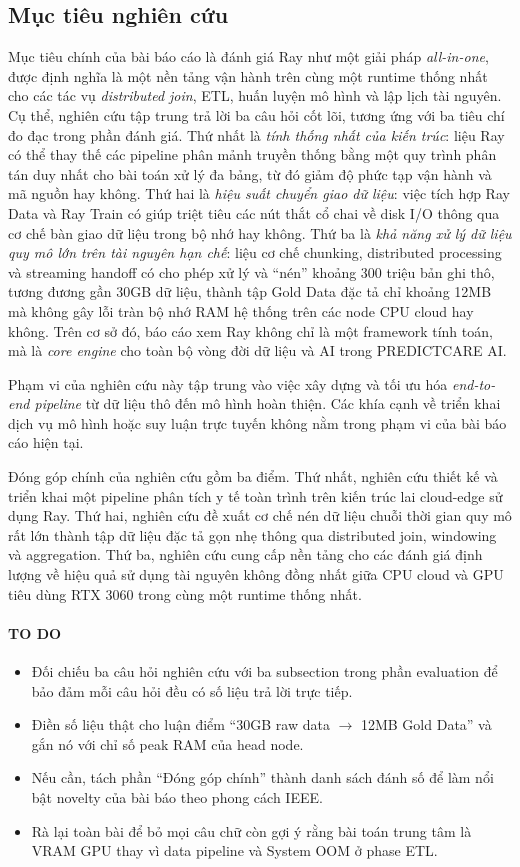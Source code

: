 \subsection{Mục tiêu nghiên cứu}
Mục tiêu chính của bài báo cáo là đánh giá Ray như một giải pháp \textit{all-in-one}, được định nghĩa là một nền tảng vận hành trên cùng một runtime thống nhất cho các tác vụ \textit{distributed join}, ETL, huấn luyện mô hình và lập lịch tài nguyên. Cụ thể, nghiên cứu tập trung trả lời ba câu hỏi cốt lõi, tương ứng với ba tiêu chí đo đạc trong phần đánh giá. Thứ nhất là \textit{tính thống nhất của kiến trúc}: liệu Ray có thể thay thế các pipeline phân mảnh truyền thống bằng một quy trình phân tán duy nhất cho bài toán xử lý đa bảng, từ đó giảm độ phức tạp vận hành và mã nguồn hay không. Thứ hai là \textit{hiệu suất chuyển giao dữ liệu}: việc tích hợp Ray Data và Ray Train có giúp triệt tiêu các nút thắt cổ chai về disk I/O thông qua cơ chế bàn giao dữ liệu trong bộ nhớ hay không. Thứ ba là \textit{khả năng xử lý dữ liệu quy mô lớn trên tài nguyên hạn chế}: liệu cơ chế chunking, distributed processing và streaming handoff có cho phép xử lý và ``nén'' khoảng 300 triệu bản ghi thô, tương đương gần 30GB dữ liệu, thành tập Gold Data đặc tả chỉ khoảng 12MB mà không gây lỗi tràn bộ nhớ RAM hệ thống trên các node CPU cloud hay không. Trên cơ sở đó, báo cáo xem Ray không chỉ là một framework tính toán, mà là \textit{core engine} cho toàn bộ vòng đời dữ liệu và AI trong PREDICTCARE AI.

Phạm vi của nghiên cứu này tập trung vào việc xây dựng và tối ưu hóa \textit{end-to-end pipeline} từ dữ liệu thô đến mô hình hoàn thiện. Các khía cạnh về triển khai dịch vụ mô hình hoặc suy luận trực tuyến không nằm trong phạm vi của bài báo cáo hiện tại.

Đóng góp chính của nghiên cứu gồm ba điểm. Thứ nhất, nghiên cứu thiết kế và triển khai một pipeline phân tích y tế toàn trình trên kiến trúc lai cloud-edge sử dụng Ray. Thứ hai, nghiên cứu đề xuất cơ chế nén dữ liệu chuỗi thời gian quy mô rất lớn thành tập dữ liệu đặc tả gọn nhẹ thông qua distributed join, windowing và aggregation. Thứ ba, nghiên cứu cung cấp nền tảng cho các đánh giá định lượng về hiệu quả sử dụng tài nguyên không đồng nhất giữa CPU cloud và GPU tiêu dùng RTX 3060 trong cùng một runtime thống nhất.

\paragraph{TO DO}
\begin{itemize}
    \item Đối chiếu ba câu hỏi nghiên cứu với ba subsection trong phần evaluation để bảo đảm mỗi câu hỏi đều có số liệu trả lời trực tiếp.
    \item Điền số liệu thật cho luận điểm ``30GB raw data $\rightarrow$ 12MB Gold Data'' và gắn nó với chỉ số peak RAM của head node.
    \item Nếu cần, tách phần ``Đóng góp chính'' thành danh sách đánh số để làm nổi bật novelty của bài báo theo phong cách IEEE.
    \item Rà lại toàn bài để bỏ mọi câu chữ còn gợi ý rằng bài toán trung tâm là VRAM GPU thay vì data pipeline và System OOM ở phase ETL.
\end{itemize}